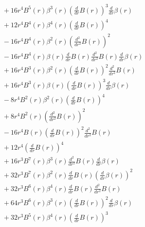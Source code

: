 \documentclass[11pt,a4paper]{article}
\begin{document}
\begin{tcolorbox}[colback=boxblue,colframe=black!40,title=\textbf{Kretschmann scalar},breakable]
\begin{align*}
  &\quad + 16 r^{4} B^{5}{\left(r \right)} \beta^{3}{\left(r \right)} \left(\frac{d}{d r} B{\left(r \right)}\right)^{3} \frac{d}{d r} \beta{\left(r \right)} \\
  &\quad + 12 r^{4} B^{4}{\left(r \right)} \beta^{4}{\left(r \right)} \left(\frac{d}{d r} B{\left(r \right)}\right)^{4} \\
  &\quad - 16 r^{4} B^{4}{\left(r \right)} \beta^{2}{\left(r \right)} \left(\frac{d^{2}}{d r^{2}} B{\left(r \right)}\right)^{2} \\
  &\quad - 16 r^{4} B^{4}{\left(r \right)} \beta{\left(r \right)} \frac{d}{d r} B{\left(r \right)} \frac{d^{2}}{d r^{2}} B{\left(r \right)} \frac{d}{d r} \beta{\left(r \right)} \\
  &\quad + 16 r^{4} B^{3}{\left(r \right)} \beta^{2}{\left(r \right)} \left(\frac{d}{d r} B{\left(r \right)}\right)^{2} \frac{d^{2}}{d r^{2}} B{\left(r \right)} \\
  &\quad + 16 r^{4} B^{3}{\left(r \right)} \beta{\left(r \right)} \left(\frac{d}{d r} B{\left(r \right)}\right)^{3} \frac{d}{d r} \beta{\left(r \right)} \\
  &\quad - 8 r^{4} B^{2}{\left(r \right)} \beta^{2}{\left(r \right)} \left(\frac{d}{d r} B{\left(r \right)}\right)^{4} \\
  &\quad + 8 r^{4} B^{2}{\left(r \right)} \left(\frac{d^{2}}{d r^{2}} B{\left(r \right)}\right)^{2} \\
  &\quad - 16 r^{4} B{\left(r \right)} \left(\frac{d}{d r} B{\left(r \right)}\right)^{2} \frac{d^{2}}{d r^{2}} B{\left(r \right)} \\
  &\quad + 12 r^{4} \left(\frac{d}{d r} B{\left(r \right)}\right)^{4} \\
  &\quad + 16 r^{3} B^{7}{\left(r \right)} \beta^{3}{\left(r \right)} \frac{d^{2}}{d r^{2}} B{\left(r \right)} \frac{d}{d r} \beta{\left(r \right)} \\
  &\quad + 32 r^{3} B^{7}{\left(r \right)} \beta^{2}{\left(r \right)} \frac{d}{d r} B{\left(r \right)} \left(\frac{d}{d r} \beta{\left(r \right)}\right)^{2} \\
  &\quad + 32 r^{3} B^{6}{\left(r \right)} \beta^{4}{\left(r \right)} \frac{d}{d r} B{\left(r \right)} \frac{d^{2}}{d r^{2}} B{\left(r \right)} \\
  &\quad + 64 r^{3} B^{6}{\left(r \right)} \beta^{3}{\left(r \right)} \left(\frac{d}{d r} B{\left(r \right)}\right)^{2} \frac{d}{d r} \beta{\left(r \right)} \\
  &\quad + 32 r^{3} B^{5}{\left(r \right)} \beta^{4}{\left(r \right)} \left(\frac{d}{d r} B{\left(r \right)}\right)^{3} \\

\end{align*}
\end{tcolorbox}
\end{document}
